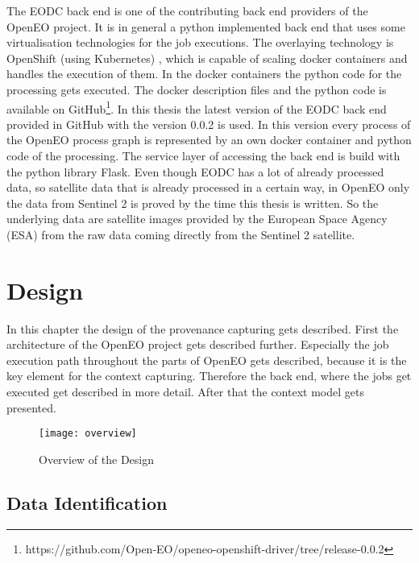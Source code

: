 \documentclass[draft,final]{vutinfth} %
\begin{document}
 The EODC back end is one of the contributing back end providers of the OpenEO project. It is in general a python implemented back end that uses some virtualisation technologies for the job executions. The overlaying technology is OpenShift (using Kubernetes) \cite{openshift}, which is capable of scaling docker containers and handles the execution of them. In the docker containers the python code for the processing gets executed. The docker description files and the python code is available on GitHub\footnote{https://github.com/Open-EO/openeo-openshift-driver/tree/release-0.0.2}. In this thesis the latest version of the EODC back end provided in GitHub with the version 0.0.2 is used. In this version every process of the OpenEO process graph is represented by an own docker container and python code of the processing. The service layer of accessing the back end is build with the python library Flask. Even though EODC has a lot of already processed data, so satellite data that is already processed in a certain way, in OpenEO only the data from Sentinel 2 is proved by the time this thesis is written. So the underlying data are satellite images provided by the European Space Agency (ESA) from the raw data coming directly from the Sentinel 2 satellite. 
 
\chapter{Design}\label{Design}
In this chapter the design of the provenance capturing gets described. First the architecture of the OpenEO project gets described further. Especially the job execution path throughout the parts of OpenEO gets described, because it is the key element for the context capturing. Therefore the back end, where the jobs get executed get described in more detail. After that the context model gets presented. 

\begin{figure}[h]
	\centering
	\texttt{[image: overview]}
	\caption{Overview of the Design}
	\label{fig:overview} %
\end{figure}

\section{Data Identification}\label{Design:Data Identification}
\end{document}
